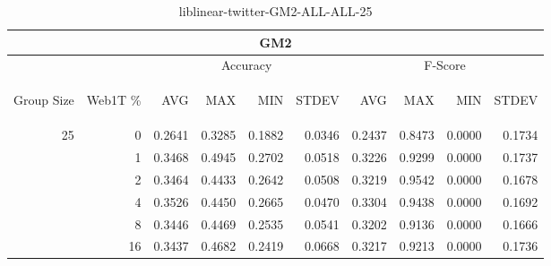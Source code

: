 \begin{center}
\begin{table}[htbp]
\begin{tabular}{ | r | r | r | r | r | r | r | r | r | r |}
\hline
\multicolumn{10}{|c|}{GM2}\\
\hline
 & & \multicolumn{4}{|c|}{Accuracy} & \multicolumn{4}{|c|}{F-Score}\\ \cline{3-10}
\begin{sideways}Group Size\end{sideways} & \begin{sideways}Web1T \%\end{sideways} & \begin{sideways}AVG\end{sideways} & \begin{sideways}MAX\end{sideways} & \begin{sideways}MIN\end{sideways} & \begin{sideways}STDEV\end{sideways} & \begin{sideways}AVG\end{sideways} & \begin{sideways}MAX\end{sideways} & \begin{sideways}MIN\end{sideways} & \begin{sideways}STDEV\end{sideways}\\
\hline
\multirow{6}{*}{25}
 & 0 & 0.2641 & 0.3285 & 0.1882 & 0.0346 & 0.2437 & 0.8473 & 0.0000 & 0.1734\\ \cline{2-10}
 & 1 & 0.3468 & 0.4945 & 0.2702 & 0.0518 & 0.3226 & 0.9299 & 0.0000 & 0.1737\\ \cline{2-10}
 & 2 & 0.3464 & 0.4433 & 0.2642 & 0.0508 & 0.3219 & 0.9542 & 0.0000 & 0.1678\\ \cline{2-10}
 & 4 & 0.3526 & 0.4450 & 0.2665 & 0.0470 & 0.3304 & 0.9438 & 0.0000 & 0.1692\\ \cline{2-10}
 & 8 & 0.3446 & 0.4469 & 0.2535 & 0.0541 & 0.3202 & 0.9136 & 0.0000 & 0.1666\\ \cline{2-10}
 & 16 & 0.3437 & 0.4682 & 0.2419 & 0.0668 & 0.3217 & 0.9213 & 0.0000 & 0.1736\\ \cline{2-10}
\hline
\end{tabular}
\caption{liblinear-twitter-GM2-ALL-ALL-25}
\end{table}
\end{center}

